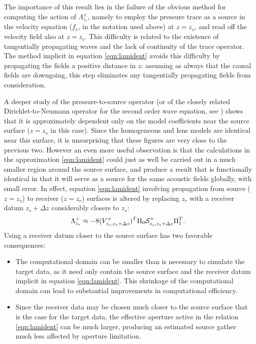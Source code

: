 \documentclass[georeport,12pt]{geophysics}
\begin{document}
The importance of this result lies in the failure of the obvious
method for computing the action of $\Lambda^{\pm}_{z_s}$, namely to
employ the pressure trace as a source in the velocity equation ($f_s$,
in the notation used above) at $z=z_s$, and read off the velocity
field also at $z=z_s$. This difficulty is related to the existence of
tangentially propagating waves and the lack of continuity of the trace
operator. The method implicit in equation \ref{eqn:lamident} avoids
this difficulty by propagating the fields a positive distance in $z$:
assuming as always that the causal fields are downgoing, this step
eliminates any tangentially propagating fields from consideration.


A deeper study of the pressure-to-source operator (or of the closely
related Dirichlet-to-Neumann operator for the second order wave
equation, see \cite{StefUhl:05}) shows that it is approximately
dependent only on the model coefficients near the source surface
($z=z_s$ in this case). Since the homogeneous and lens models are
identical near this surface, it is unsurprising that these figures are
very close to the previous two.  However an even more useful
observation is that the calculations in the approximation
\ref{eqn:lamident} could just as well be carried out in a much smaller
region around the source surface, and produce a result that is
functionally identical in that it will serve as a source for the same
acoustic fields globally, with small error. In effect, equation
\ref{eqn:lamident} involving propagation from source ($z=z_s$) to
receiver ($z=z_r$) surfaces is altered by replacing $z_r$ with a
receiver datum $z_s+\Delta z$ considerably closers to $z_s$:
\begin{equation}
  \label{eqn:lamnear}
  \Lambda^+_{z_s} \approx -8(V^{+}_{z_s,z_s+\Delta z})^T\Pi_0 {\cal
    S}^+_{z_s,z_s+\Delta z}\Pi_1^T.
\end{equation}
Using a receiver datum closer to the source surface has two favorable consequences:
\begin{itemize}
\item The computational domain can be smaller than is necessary to
  simulate the target data, as it need only contain the source
  surface and the receiver datum implicit in
  equation \ref{eqn:lamident}. This shrinkage of the computational
  domain can lead to substantial improvements in computational
  efficiency.
\item Since the receiver data may be chosen much closer to the
  source surface that is the case for the target data, the effective
  aperture active in the relation \ref{eqn:lamident} can be much
  larger, producing an estimated source gather much less affected by
  aperture limitation.
\end{itemize}
\end{document}
